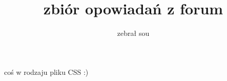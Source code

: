 \documentclass[12pt, openany, a4paper, draft, twocolumn]{stalker}
\author{zebrał sou}
\title
{\small{zbiór opowiadań z forum}\\[5ex]
\Huge\textls{stalker.pl}}
\date{}
\begin{document}
coś w rodzaju pliku CSS :)
\end{document}
